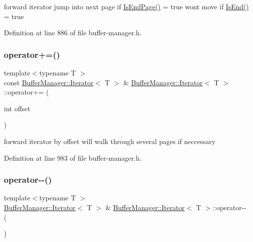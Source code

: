 forward iterator jump into next page if {\ttfamily \mbox{\hyperlink{class_buffer_manager_1_1_iterator_a6afaceac9683f05d9e1ecfc9ff5f3a0f}{Is\+End\+Page()}} = true} won\textquotesingle{}t move if {\ttfamily \mbox{\hyperlink{class_buffer_manager_1_1_iterator_a02a38a84fd54e45d06818d2807b172d8}{Is\+End()}} = true} 

Definition at line 886 of file buffer-\/manager.\+h.

\mbox{\label{class_buffer_manager_1_1_iterator_aced12f95569a91d98a83bf635d671e25}} 
\subsubsection{\texorpdfstring{operator+=()}{operator+=()}}
{\footnotesize\ttfamily template$<$typename T $>$ \\
const \mbox{\hyperlink{class_buffer_manager_1_1_iterator}{Buffer\+Manager\+::\+Iterator}}$<$ T $>$ \& \mbox{\hyperlink{class_buffer_manager_1_1_iterator}{Buffer\+Manager\+::\+Iterator}}$<$ T $>$\+::operator+= (\begin{DoxyParamCaption}\item[{int}]{offset }\end{DoxyParamCaption})\hspace{0.3cm}{\ttfamily [inline]}}

forward iterator by offset will walk through several pages if neccessary 

Definition at line 983 of file buffer-\/manager.\+h.

\mbox{\label{class_buffer_manager_1_1_iterator_ab9959f549dcfa3f6daa47677552b673d}} 
\subsubsection{\texorpdfstring{operator-\/-\/()}{operator--()}}
{\footnotesize\ttfamily template$<$typename T $>$ \\
\mbox{\hyperlink{class_buffer_manager_1_1_iterator}{Buffer\+Manager\+::\+Iterator}}$<$ T $>$ \& \mbox{\hyperlink{class_buffer_manager_1_1_iterator}{Buffer\+Manager\+::\+Iterator}}$<$ T $>$\+::operator-\/-\/ (\begin{DoxyParamCaption}{ }\end{DoxyParamCaption})\hspace{0.3cm}{\ttfamily [inline]}}

